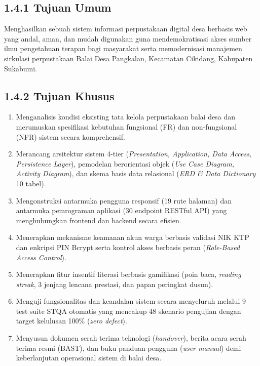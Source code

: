 \documentclass[
  indonesian,
  12pt,
]{report}
\providecommand{\tightlist}{%
  \setlength{\itemsep}{0pt}\setlength{\parskip}{0pt}}
\begin{document}
\subsection{1.4.1 Tujuan Umum}\label{tujuan-umum}

Menghasilkan sebuah sistem informasi perpustakaan digital desa berbasis
web yang andal, aman, dan mudah digunakan guna mendemokratisasi akses
sumber ilmu pengetahuan terapan bagi masyarakat serta memodernisasi
manajemen sirkulasi perpustakaan Balai Desa Pangkalan, Kecamatan
Cikidang, Kabupaten Sukabumi.

\subsection{1.4.2 Tujuan Khusus}\label{tujuan-khusus}

\begin{enumerate}
\def\labelenumi{\arabic{enumi}.}
\tightlist
\item
  Menganalisis kondisi eksisting tata kelola perpustakaan balai desa dan
  merumuskan spesifikasi kebutuhan fungsional (FR) dan non-fungsional
  (NFR) sistem secara komprehensif.
\item
  Merancang arsitektur sistem 4-tier (\emph{Presentation, Application,
  Data Access, Persistence Layer}), pemodelan berorientasi objek
  (\emph{Use Case Diagram, Activity Diagram}), dan skema basis data
  relasional (\emph{ERD \& Data Dictionary} 10 tabel).
\item
  Mengonstruksi antarmuka pengguna responsif (19 rute halaman) dan
  antarmuka pemrograman aplikasi (30 endpoint RESTful API) yang
  menghubungkan frontend dan backend secara efisien.
\item
  Menerapkan mekanisme keamanan akun warga berbasis validasi NIK KTP dan
  enkripsi PIN Bcrypt serta kontrol akses berbasis peran
  (\emph{Role-Based Access Control}).
\item
  Menerapkan fitur insentif literasi berbasis gamifikasi (poin baca,
  \emph{reading streak}, 3 jenjang lencana prestasi, dan papan peringkat
  dusun).
\item
  Menguji fungsionalitas dan keandalan sistem secara menyeluruh melalui
  9 test suite STQA otomatis yang mencakup 48 skenario pengujian dengan
  target kelulusan 100\% (\emph{zero defect}).
\item
  Menyusun dokumen serah terima teknologi (\emph{handover}), berita
  acara serah terima resmi (BAST), dan buku panduan pengguna (\emph{user
  manual}) demi keberlanjutan operasional sistem di balai desa.
\end{enumerate}
\end{document}
